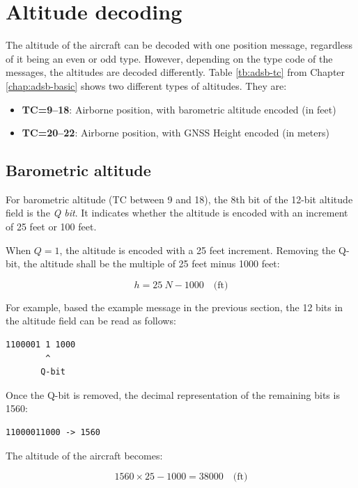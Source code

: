 \section{Altitude decoding}

The altitude of the aircraft can be decoded with one position message, regardless of it being an even or odd type. However, depending on the type code of the messages, the altitudes are decoded differently. Table \ref{tb:adsb-tc} from Chapter \ref{chap:adsb-basic} shows two different types of altitudes. They are:

\begin{itemize}
\item \textbf{TC=9--18}: Airborne position, with barometric altitude encoded (in feet)
\item \textbf{TC=20--22}: Airborne position, with GNSS Height encoded (in meters)
\end{itemize}

\subsection{Barometric altitude}
For barometric altitude (TC between 9 and 18), the 8th bit of the 12-bit altitude field is the \emph{Q bit}. It indicates whether the altitude is encoded with an increment of 25 feet or 100 feet.

When $Q=1$, the altitude is encoded with a 25 feet increment. Removing the Q-bit, the altitude shall be the multiple of 25 feet minus 1000 feet:

\begin{equation}
  h = 25 ~ N - 1000 \quad \text{(ft)}
\end{equation}

For example, based the example message in the previous section, the 12 bits in the altitude field can be read as follows:

\begin{verbatim}
1100001 1 1000
        ^
       Q-bit
\end{verbatim}

Once the Q-bit is removed, the decimal representation of the remaining bits is 1560:

\begin{verbatim}
11000011000 -> 1560
\end{verbatim}

The altitude of the aircraft becomes:

\begin{equation}
1560 \times 25 - 1000 = 38000 \quad \text{(ft)}
\end{equation}

